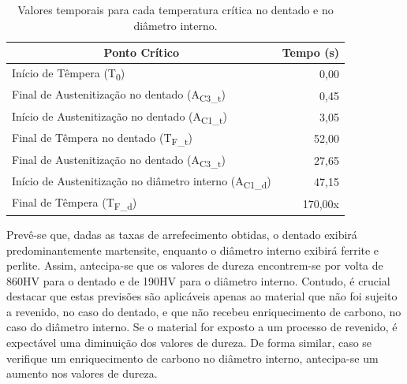 \begin{table}[htb]
    \centering
    \caption[Valores temporais para cada temperatura crítica]{Valores temporais para cada temperatura crítica no dentado e no diâmetro interno.}
    \label{tab:pontos_sim}
    \begin{tabular}{lr} 
    \toprule
    \multicolumn{1}{c}{\textbf{Ponto Crítico}}            & \multicolumn{1}{c}{\textbf{Tempo (s)}}                         \\ 
    \hline\hline
    Início de Têmpera (T\textsubscript{0})                                & 0,00                                         \\ 
    \hline
    Final de Austenitização no dentado (A\textsubscript{C3\_t})           & 0,45                                         \\
    Início de Austenitização no dentado (A\textsubscript{C1\_t})          & 3,05                                         \\
    Final de Têmpera no dentado (T\textsubscript{F\_t})                   & 52,00                                        \\ 
    \hline\hline
    Final de Austenitização no dentado (A\textsubscript{C3\_t})           & 27,65                                       \\
    Início de Austenitização no diâmetro interno (A\textsubscript{C1\_d}) & 47,15                                        \\ 
    Final de Têmpera (T\textsubscript{F\_d})                              & 170,00x                                       \\
    \bottomrule
    \end{tabular}
\end{table}
\par
Prevê-se que, dadas as taxas de arrefecimento obtidas, o dentado exibirá predominantemente martensite, enquanto o diâmetro interno exibirá ferrite e perlite. Assim, antecipa-se que os valores de dureza encontrem-se por volta de 860HV para o dentado e de 190HV para o diâmetro interno. Contudo, é crucial destacar que estas previsões são aplicáveis apenas ao material que não foi sujeito a revenido, no caso do dentado, e que não recebeu enriquecimento de carbono, no caso do diâmetro interno. Se o material for exposto a um processo de revenido, é expectável uma diminuição dos valores de dureza. De forma similar, caso se verifique um enriquecimento de carbono no diâmetro interno, antecipa-se um aumento nos valores de dureza.
